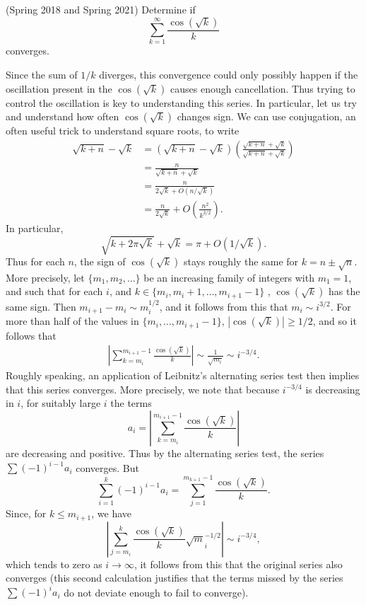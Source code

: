 \documentclass[answers]{exam}
\begin{document}
\begin{questions}
\question (Spring 2018 and Spring 2021) Determine if
%
\[ \sum_{k = 1}^\infty \frac{\cos(\sqrt{k})}{k} \]
%
converges.
\begin{solution}
    Since the sum of $1/k$ diverges, this convergence could only possibly happen if the oscillation present in the $\cos(\sqrt{k})$ causes enough cancellation. Thus trying to control the oscillation is key to understanding this series. In particular, let us try and understand how often $\cos(\sqrt{k})$ changes sign. We can use conjugation, an often useful trick to understand square roots, to write
    \begin{align*}
        \sqrt{k+n} - \sqrt{k} &= (\sqrt{k+n} - \sqrt{k}) \left( \frac{\sqrt{k+n} + \sqrt{k}}{\sqrt{k+n} + \sqrt{k}} \right)\\
        &= \frac{n}{\sqrt{k+n} + \sqrt{k}}\\
        &= \frac{n}{2\sqrt{k} + O(n/\sqrt{k})}\\
        &= \frac{n}{2\sqrt{k}} + O \left( \frac{n^2}{k^{3/2}} \right).
    \end{align*}
    In particular,
    \[ \sqrt{k + 2 \pi \sqrt{k}} + \sqrt{k} = \pi + O(1/\sqrt{k}). \]
    Thus for each $n$, the sign of $\cos(\sqrt{k})$ stays roughly the same for $k = n \pm \sqrt{n}$. More precisely, let $\{ m_1, m_2, \dots \}$ be an increasing family of integers with $m_1 = 1$, and such that for each $i$, and $k \in \{ m_i, m_i + 1, \dots, m_{i+1} - 1 \}$ , $\cos(\sqrt{k})$ has the same sign. Then $m_{i+1} - m_i \sim m_i^{1/2}$, and it follows from this that $m_i \sim i^{3/2}$. For more than half of the values in $\{ m_i, \dots, m_{i+1} - 1 \}$, $|\cos(\sqrt{k})| \geq 1/2$, and so it follows that
    \begin{align*}
        \left| \sum_{k = m_i}^{m_{i+1} - 1} \frac{\cos(\sqrt{k})}{k} \right| \sim \frac{1}{\sqrt{m_i}} \sim i^{-3/4}.
    \end{align*}
    Roughly speaking, an application of Leibnitz's alternating series test then implies that this series converges. More precisely, we note that because $i^{-3/4}$ is decreasing in $i$, for suitably large $i$ the terms
    \[ a_i = \left| \sum_{k = m_i}^{m_{i+1} - 1} \frac{\cos(\sqrt{k})}{k} \right| \]
    are decreasing and positive. Thus by the alternating series test, the series $\sum (-1)^{i-1} a_i$ converges. But
    \[ \sum_{i = 1}^k (-1)^{i-1} a_i = \sum_{j = 1}^{m_{k+1} - 1} \frac{\cos(\sqrt{k})}{k}. \]
    Since, for $k \leq m_{i+1}$, we have
    \[ \left| \sum_{j = m_i}^k \frac{\cos(\sqrt{k})}{k} \sqrt m_i^{-1/2} \right| \sim i^{-3/4}, \]
    which tends to zero as $i \to \infty$, it follows from this that the original series also converges (this second calculation justifies that the terms missed by the series $\sum (-1)^i a_i$ do not deviate enough to fail to converge).
\end{solution}



\end{questions}
\end{document}
